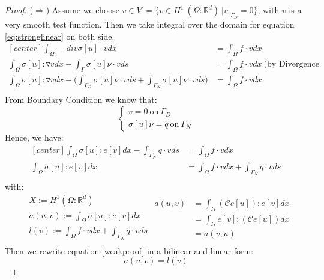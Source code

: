 \documentclass[a4paper,11pt]{article}
\newcommand{\R}{\mathbb{R}}
\newcommand{\Cmod}{\mathcal{C}}
\begin{document}
\begin{proof}
	($\Rightarrow$)
	Assume we choose $v \in V:= \{ v \in H^1\ (\Omega : \R^d)\ |v|_{\Gamma_D} = 0 \}$, with $v$ is a very smooth test function. Then we take integral over the domain for equation \eqref{eq:stronglinear} on both side.
	\begin{equation*}
	\begin{aligned}[center]
	\int_\Omega -div\sigma[u] \cdot v dx &= \int_\Omega f \cdot v dx\\
	\int_\Omega \sigma[u] : \triangledown v dx - \int_\Gamma \sigma[u]\nu \cdot v ds &= \int_\Omega f \cdot v dx\  \text{(by Divergence Formula)}\\
	\int_\Omega \sigma[u] : \triangledown v dx - \bigg(\int_{\Gamma_D} \sigma[u]\nu \cdot v ds + \int_{\Gamma_N} \sigma[u]\nu \cdot v ds\bigg) &= \int_\Omega f \cdot v dx\\	
	\end{aligned}
	\end{equation*}
	From Boundary Condition we know that:
	\begin{equation*}
	\begin{cases}
	v = 0\ \text{on}\ \Gamma_D\\
	\sigma[u] \nu = q\ \text{on}\ \Gamma_N
	\end{cases}
	\end{equation*}
	Hence, we have:
	\begin{equation}\label{weakproof}
	\begin{aligned}[center]
	\int_\Omega \sigma[u] : e[v] dx - \int_{\Gamma_N} q \cdot v ds &= \int_\Omega f \cdot v dx\\
	\int_\Omega \sigma[u] : e[v] dx &= \int_\Omega f \cdot v dx + \int_{\Gamma_N} q \cdot v ds \\
	\end{aligned}
	\end{equation}
	with:
	\begin{equation*}
	\begin{aligned}
	&X:= H^1(\Omega : \R^d)\\
	&a(u,v) := \int_\Omega \sigma[u] : e[v] dx\\
	&l(v) := \int_\Omega f\cdot v dx + \int_{\Gamma_N} q \cdot v ds\\
	\end{aligned}
	\begin{aligned}
	a(u,v) &= \int_\Omega (\Cmod e[u]) : e[v] dx\\
	&= \int_\Omega e[v] : (\Cmod e[u]) dx\\
	&= a(v,u)
	\end{aligned}
	\end{equation*}
	Then we rewrite equation \eqref{weakproof} in a bilinear and linear form:
	\begin{equation*}
	a(u,v) = l(v)
	\end{equation*}
	

\end{proof}
\end{document}
